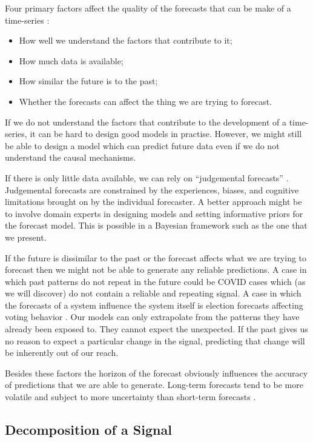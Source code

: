 \documentclass{article}
\begin{document}
Four primary factors affect the quality of the forecasts that can be make of a time-series \cite{fpp3}:

\begin{itemize}
    \item How well we understand the factors that contribute to it;
    \item How much data is available;
    \item How similar the future is to the past;
    \item Whether the forecasts can affect the thing we are trying to forecast.
\end{itemize}

If we do not understand the factors that contribute to the development of a time-series, it can be hard to design good models in practise. However, we might still be able to design a model which can predict future data even if we do not understand the causal mechanisms. 

If there is only little data available, we can rely on “judgemental forecasts” \cite{fpp3}. Judgemental forecasts are constrained by the experiences, biases, and cognitive limitations brought on by the individual forecaster. A better approach might be to involve domain experts in designing models and setting informative priors for the forecast model.  This is possible in a Bayesian framework such as the one that we present.

If the future is dissimilar to the past or the forecast affects what we are trying to forecast then we might not be able to generate any reliable predictions. A case in which past patterns do not repeat in the future could be COVID cases which (as we will discover) do not contain a reliable and repeating signal. A case in which the forecasts of a system influence the system itself is election forecasts affecting voting behavior \cite{exit-polls1, exit-polls2,exit-polls3}. Our models can only extrapolate from the patterns they have already been exposed to. They cannot expect the unexpected. If the past gives us no reason to expect a particular change in the signal, predicting that change will be inherently out of our reach. 

Besides these factors the horizon of the forecast obviously influences the accuracy of predictions that we are able to generate. Long-term forecasts tend to be more volatile and subject to more uncertainty than short-term forecasts \cite{Luke-Muehlhauser}.  


\subsection{Decomposition of a Signal}
\end{document}
